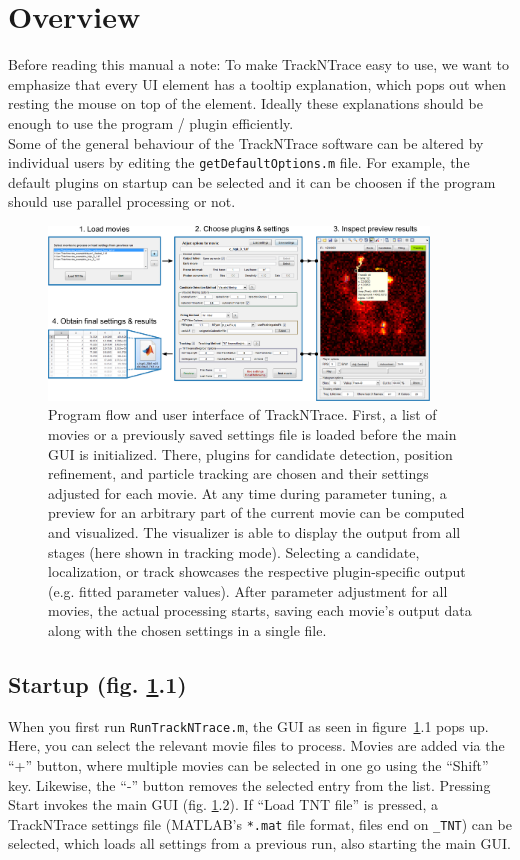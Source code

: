 \documentclass[11pt,onside]{report}
\numberwithin{equation}{chapter}
\begin{document}
\section{Overview}\label{sec:overview}
Before reading this manual a note: To make TrackNTrace easy to use, we want to emphasize that every UI element has a tooltip explanation, which pops out when resting the mouse on top of the element. Ideally these explanations should be enough to use the program / plugin efficiently.\\

Some of the general behaviour of the TrackNTrace software can be altered by individual users by editing the \texttt{getDefaultOptions.m} file. For example, the default plugins on startup can be selected and it can be choosen if the program should use parallel processing or not.

\begin{figure}[!h]
\centering
\includegraphics[width=0.9\textwidth]{./fig0.pdf} 
\caption{Program flow and user interface of TrackNTrace. First, a list of movies or a previously saved settings file is loaded before the main GUI is initialized. There, plugins for candidate detection, position refinement, and particle tracking are chosen and their settings adjusted for each movie. At any time during parameter tuning, a preview for an arbitrary part of the current movie can be computed and visualized. The visualizer is able to display the output from all stages (here shown in tracking mode). Selecting a candidate, localization, or track showcases the respective plugin-specific output (e.g. fitted parameter values). After parameter adjustment for all movies, the actual processing starts, saving each movie's output data along with the chosen settings in a single file.}
\label{fig:flowdiagram}
\end{figure}

\subsection*{Startup (fig. \ref{fig:flowdiagram}.1)}
When you first run \texttt{RunTrackNTrace.m}, the GUI as seen in figure~\ref{fig:flowdiagram}.1 pops up. Here, you can select the relevant movie files to process. Movies are added via the ``\textsf{+}'' button, where multiple movies can be selected in one go using the ``\textsf{Shift}'' key. Likewise, the ``\textsf{-}'' button removes the selected entry from the list. Pressing \textsf{Start} invokes the main GUI (fig. \ref{fig:flowdiagram}.2). If ``\textsf{Load TNT file}'' is pressed, a TrackNTrace settings file (MATLAB's \texttt{*.mat} file format, files end on \texttt{\_TNT}) can be selected, which loads all settings from a previous run, also starting the main GUI.
\end{document}
